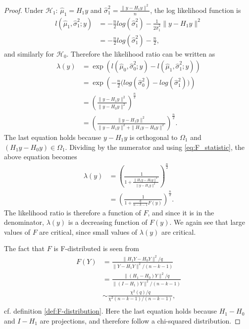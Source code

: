 \begin{proof}
    Under $\mathcal{H}_1$: $\hat{\mu}_1 = H_1 y$ and $\hat{\sigma}_1^2 = \frac{\| y - H_1 y \|^2}{n}$, the log likelihood function is
    \begin{align*}
        l(\hat{\mu}_1, \hat{\sigma}_1^2; y) &= -\frac{n}{2} log(\hat{\sigma}_1^2) - \frac{1}{2 \hat{\sigma}_1^2} \| y - H_1 y \|^2 \\
        &= -\frac{n}{2} log(\hat{\sigma}_1^2) - \frac{n}{2},
    \end{align*}
    and similarly for $\mathcal{H}_0$. Therefore the likelihood ratio can be written as
    \begin{align*}
        \lambda(y) &= \exp \left( l(\hat{\mu}_0, \hat{\sigma}_0^2; y) - l(\hat{\mu}_1, \hat{\sigma}_1^2; y) \right) \\
        &= \exp \left( -\frac{n}{2} \Big( log(\hat{\sigma}_0^2) - log(\hat{\sigma}_1^2)\Big) \right) \\
        &= \left( \frac{\| y - H_1 y \|^2}{\| y - H_0 y \|^2} \right)^{\frac{n}{2}} \\
        &= \left( \frac{\| y - H_1 y \|^2}{\| y - H_1 y \|^2 + \| H_1 y - H_0 y \|^2} \right)^{\frac{n}{2}}.
    \end{align*}
    The last equation holds because $y - H_1 y$ is orthogonal to $\Omega_1$ and $(H_1 y - H_0 y) \in \Omega_1$. Dividing by the numerator and using \eqref{eq:F_statistic}, the above equation becomes
    \begin{align*}
        \lambda(y) &= \left( \frac{1}{1 + \frac{\| H_1 y - H_0 y \|^2}{\| y - H_1 y \|^2}} \right)^{\frac{n}{2}} \\
        &= \left( \frac{1}{1 + \frac{q}{n-k-1}F(y)}  \right)^{\frac{n}{2}}.
    \end{align*}
    The likelihood ratio is therefore a function of $F$, and since it is in the denominator, $\lambda(y)$ is a decreasing function of $F(y)$. We again see that large values of $F$ are critical, since small values of $\lambda(y)$ are critical.
    
    The fact that $F$ is F-distributed is seen from
    \begin{align*}
        F(Y) &= \frac{\| H_1 Y - H_0 Y \|^2/q}{\| Y - H_1 Y \|^2/(n-k-1)} \\
        &= \frac{\| (H_1 - H_0) Y \|^2/q}{\| (I - H_1) Y \|^2/(n-k-1)} \\
        &\sim \frac{\chi^2(q)/q}{\chi^2(n-k-1)/(n-k-1)}, \\
    \end{align*}
    cf. definition \ref{def:F-distribution}. Here the last equation holds because $H_1 - H_0$ and $I - H_1$ are projections, and therefore follow a chi-squared distribution.
\end{proof}


